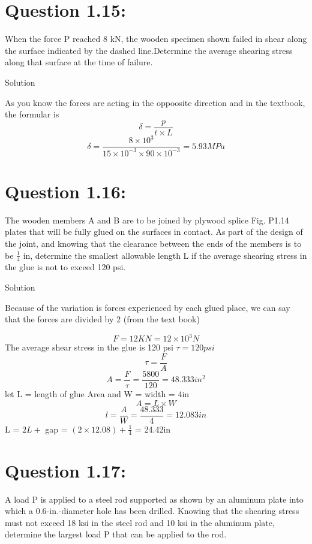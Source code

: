 \documentclass{article}
\begin{document}
\section*{\textbf{Question 1.15:}}
When the force P reached 8 kN, the wooden specimen shown failed in shear along the surface indicated by the dashed line.Determine the average shearing stress along that surface at the time of failure. 

\begin{center} Solution \end{center}
As you know the forces are acting in the oppoosite direction and in the textbook, the formular is
\[ \delta = \frac{p}{t \times L}\]
\[ \delta = \frac{8\times 10^{3}}{15 \times 10^{-3} \times 90 \times 10^{-3}} = 5.93MPa\]


\section*{\textbf{Question 1.16:}}
The wooden members A and B are to be joined by plywood splice Fig. P1.14 plates that will be fully glued on the surfaces in contact. As part of the design of the joint, and knowing that the clearance between the ends of the members is to be $\frac{1}{4}$  in, determine the smallest allowable length L if the average shearing stress in the glue is not to exceed 120 psi.
 \begin{center} Solution\end{center}
Because of the variation is forces experienced by each glued place, we can say that the forces are divided by 2 (from the text book)

\[F = 12KN = 12 \times 10^{3}N\]
The average shear stress in the glue is 120 psi $\tau = 120psi$
\[\tau = \frac{F}{A} \]
\[A = \frac{F}{\tau} = \frac{5800}{120} = 48.333in^{2}\]
let L = length of glue Area and W =  width = 4in
\[A= L \times W\]
\[l = \frac{A}{W} = \frac{48.333}{4} = 12.083in\]
 L = $2L +$ gap = $(2\times 12.08)+ \frac{1}{4}$ = 24.42in

\section*{\textbf{Question 1.17:}}
A load P is applied to a steel rod supported as shown by an aluminum plate into which a 0.6-in.-diameter hole has been drilled. Knowing that the shearing stress must not exceed 18 ksi in the steel rod and 10 ksi in the aluminum plate, determine the largest load P that can be applied to the rod.
\end{document}
